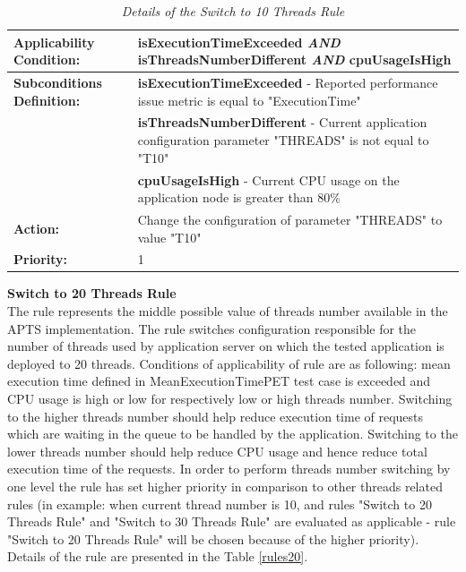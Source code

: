 \documentclass[12pt,a4paper]{article}
\begin{document}
\begin{table}[!htb]
\def\arraystretch{1.5}
\caption{\textit{Details of the Switch to 10 Threads Rule}} \label{rules10}
\begin{tabularx}{\textwidth}{p{2.1cm}|X}

\textbf{Applicability Condition:} & \textbf{isExecutionTimeExceeded} \textit{AND} \newline
\textbf{isThreadsNumberDifferent} \textit{AND} \newline
\textbf{cpuUsageIsHigh} \\ \hline

\textbf{Subconditions Definition:} & \textbf{isExecutionTimeExceeded} -  Reported performance issue metric is equal to "ExecutionTime"  \\
& \textbf{isThreadsNumberDifferent} -  Current application configuration parameter "THREADS" is not equal to "T10" \\
& \textbf{cpuUsageIsHigh} - Current CPU usage on the application node is greater than 80\% \\ \hline

\textbf{Action:} & Change the configuration of parameter "THREADS" to value "T10" \\ \hline
\textbf{Priority:} & 1\\
\end{tabularx}
\end{table}
\vspace{5mm}
\noindent\textbf{Switch to 20 Threads Rule} \\
The rule represents the middle possible value of threads number available in the APTS implementation. The rule switches configuration responsible for the number of threads used by application server on which the tested application is deployed to 20 threads. Conditions of applicability of rule are as following: mean execution time defined in MeanExecutionTimePET test case is exceeded and CPU usage is high or low for respectively low or high threads number. Switching to the higher threads number should help reduce execution time of requests which are waiting in the queue to be handled by the application. Switching to the lower threads number should help reduce CPU usage and hence reduce total execution time of the requests. In order to perform threads number switching by one level the rule has set higher priority in comparison to other threads related rules (in example: when current thread number is 10, and rules "Switch to 20 Threads Rule" and "Switch to 30 Threads Rule" are evaluated as applicable - rule "Switch to 20 Threads Rule" will be chosen because of the higher priority). Details of the rule are presented in the Table \ref{rules20}.
\end{document}
